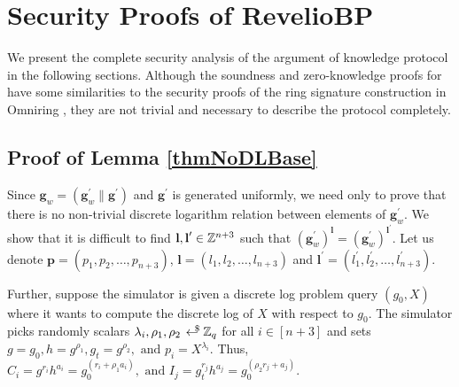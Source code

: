 \appendix
\chapter{Security Proofs of \textnormal{{\selectfont RevelioBP}}}
\label{scn:appendix}

We present the complete security analysis of the argument of knowledge \proto protocol in the following sections.
Although the soundness and zero-knowledge proofs for \proto have some similarities to the security proofs of the ring signature construction in Omniring \cite{Lai2019}, 
they are not trivial and necessary to describe the \RPlus protocol completely.

\section{Proof of Lemma \ref{thmNoDLBase}}
\label{proofThmNoDLBase}
Since $\textbf{g}_w = (\textbf{g}_w^{\prime} \| \textbf{g}^{\prime})$ and $\textbf{g}^{\prime}$ is generated uniformly, we need only to prove that there is no non-trivial discrete logarithm relation between elements of $\textbf{g}_w^{\prime}$. We show that it is difficult to find $\textbf{l}, \textbf{l}^{\prime} \in \mathbb{Z}^{n+3}$ such that 
$(\textbf{g}_w^{\prime})^{\textbf{l}} = (\textbf{g}_w^{\prime})^{\textbf{l}^{\prime}}$.
Let us denote $\textbf{p} = (p_1, p_2, \dots, p_{n+3})$, $\textbf{l} = (l_1, l_2, \dots, l_{n+3})$ and $\textbf{l}^{\prime} = (l_1^{\prime}, l_2^{\prime}, \dots, l_{n+3}^{\prime})$.

Further, suppose the simulator is given a discrete log problem query $(g_0, X)$ where it wants to compute the discrete log of $X$ with respect to $g_0$. 
The simulator picks randomly scalars $\lambda_i, \rho_1, \rho_2 \rgen \Z_q $ for all $i \in [n+3]$ and sets $g = g_0, h = g^{\rho_1}, g_t = g^{\rho_2}, \text{ and } p_i = X^{\lambda_i}$.
Thus, $C_i = g^{r_i} h^{a_i} = g_0^{(r_i + \rho_1 a_i)}, \text{ and } I_j = g_t^{r_j} h^{a_j} = g_0^{(\rho_2 r_j + a_j)}$.

